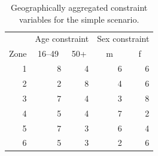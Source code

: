 \documentclass[a4paper,10pt]{article}
\begin{document}

\begin{table}[htbp]
\caption{Geographically aggregated constraint variables for the simple
scenario.}
\begin{center}
\begin{tabular}{rrrrr}
\toprule
\multicolumn{1}{l}{} & \multicolumn{2}{c}{Age constraint} & \multicolumn{2}{c}{Sex constraint} \\
\multicolumn{1}{l}{Zone} & \multicolumn{1}{c}{16--49} & \multicolumn{1}{c}{50+} & \multicolumn{1}{c}{m} & \multicolumn{1}{c}{f} \\
\midrule
1 & 8 & 4 & 6 & 6 \\
2 & 2 & 8 & 4 & 6 \\
3 & 7 & 4 & 3 & 8 \\
4 & 5 & 4 & 7 & 2 \\
5 & 7 & 3 & 6 & 4 \\
6 & 5 & 3 & 2 & 6 \\
\bottomrule
\end{tabular}
\end{center}
\label{t2}
\end{table}
\end{document}
